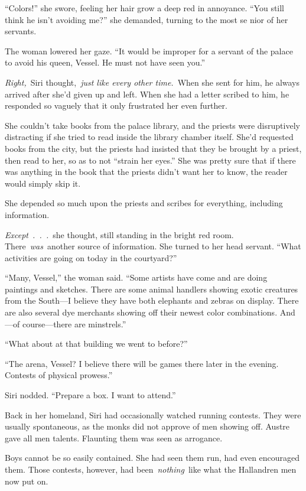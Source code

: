 “Colors!” she swore, feeling her hair grow a deep red in annoyance. “You still think he isn’t avoiding me?” she demanded, turning to the most se nior of her servants.

The woman lowered her gaze. “It would be improper for a servant of the palace to avoid his queen, Vessel. He must not have seen you.”

\textit{Right,}~Siri thought,~\textit{just like every other time.}~When she sent for him, he always arrived after she’d given up and left. When she had a letter scribed to him, he responded so vaguely that it only frustrated her even further.

She couldn’t take books from the palace library, and the priests were disruptively distracting if she tried to read inside the library chamber itself. She’d requested books from the city, but the priests had insisted that they be brought by a priest, then read to her, so as to not “strain her eyes.” She was pretty sure that if there was anything in the book that the priests didn’t want her to know, the reader would simply skip it.

She depended so much upon the priests and scribes for everything, including information.

\textit{Except~.~.~.}~she thought, still standing in the bright red room. There~\textit{was}~another source of information. She turned to her head servant. “What activities are going on today in the courtyard?”

“Many, Vessel,” the woman said. “Some artists have come and are doing paintings and sketches. There are some animal handlers showing exotic creatures from the South—I believe they have both elephants and zebras on display. There are also several dye merchants showing off their newest color combinations. And—of course—there are minstrels.”

“What about at that building we went to before?”

“The arena, Vessel? I believe there will be games there later in the evening. Contests of physical prowess.”

Siri nodded. “Prepare a box. I want to attend.”

\orn

Back in her homeland, Siri had occasionally watched running contests. They were usually spontaneous, as the monks did not approve of men showing off. Austre gave all men talents. Flaunting them was seen as arrogance.

Boys cannot be so easily contained. She had seen them run, had even encouraged them. Those contests, however, had been~\textit{nothing}~like what the Hallandren men now put on.

